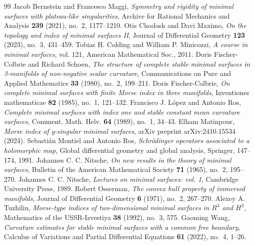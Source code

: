 \documentclass[10pt,a4paper]{amsart}
\theoremstyle{theorem}
\theoremstyle{definition}
\numberwithin{equation}{section}
\begin{document}
\begin{thebibliography}{99}
  Jacob Bernstein and Francesco Maggi, \emph{Symmetry and rigidity of minimal surfaces with plateau-like singularities}, Archive for Rational Mechanics and Analysis \textbf{239} (2021), no.~2, 1177--1210.
  Otis Chodosh and Davi Maximo, \emph{On the topology and index of minimal surfaces II}, Journal of Differential Geometry \textbf{123} (2023), no.~3, 431--459.
  Tobias H. Colding and William P. Minicozzi, \emph{A course in minimal surfaces}, vol. 121, American Mathematical Soc., 2011.
  Doris Fischer-Colbrie and Richard Schoen, \emph{The structure of complete stable minimal surfaces in 3-manifolds of non-negative scalar curvature}, Communications on Pure and Applied Mathematics \textbf{33} (1980), no.~2, 199--211.
  Doris Fischer-Colbrie, \emph{On complete minimal surfaces with finite Morse index in three manifolds}, Inventiones mathematicae \textbf{82} (1985), no.~1, 121--132.
  Francisco J. López and Antonio Ros, \emph{Complete minimal surfaces with index one and stable constant mean curvature surfaces}, Comment. Math. Helv. \textbf{64} (1989), no.~1, 34--43.
  Elham Matinpour, \emph{Morse index of y-singular minimal surfaces}, arXiv preprint arXiv:2410.15534 (2024).
  Sebastián Montiel and Antonio Ros, \emph{Schrödinger operators associated to a holomorphic map}, Global differential geometry and global analysis, Springer, 147--174, 1991.
  Johannes C. C. Nitsche, \emph{On new results in the theory of minimal surfaces}, Bulletin of the American Mathematical Society \textbf{71} (1965), no.~2, 195--270.
  Johannes C. C. Nitsche, \emph{Lectures on minimal surfaces: vol. 1}, Cambridge University Press, 1989.
  Robert Osserman, \emph{The convex hull property of immersed manifolds}, Journal of Differential Geometry \textbf{6} (1971), no.~2, 267--270.
  Alexey A. Tuzhilin, \emph{Morse-type indices of two-dimensional minimal surfaces in $R^3$ and $H^3$}, Mathematics of the USSR-Izvestiya \textbf{38} (1992), no.~3, 575.
  Gaoming Wang, \emph{Curvature estimates for stable minimal surfaces with a common free boundary}, Calculus of Variations and Partial Differential Equations \textbf{61} (2022), no.~4, 1--26.
\end{thebibliography}
\end{document}
